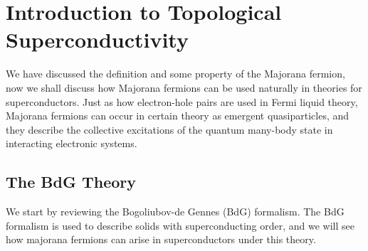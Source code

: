 \documentclass[11pt, oneside]{book}
\theoremstyle{break}
\theoremstyle{break}
\begin{document}
\chapter[Introduction to Topological Superconductivity]{Introduction to Topological\\ Superconductivity}
We have discussed the definition and some property of the Majorana fermion, now we shall discuss how Majorana fermions can be used naturally in theories for superconductors. Just as how  electron-hole pairs are used in Fermi liquid theory, Majorana fermions can occur in certain theory as emergent quasiparticles, and they describe the collective excitations of the quantum many-body state in interacting electronic systems.

\section{The BdG Theory}
We start by reviewing the Bogoliubov-de Gennes (BdG) formalism. The BdG formalism is used to describe solids with superconducting order, and we will see how majorana fermions can arise in superconductors under this theory. \\
\end{document}
